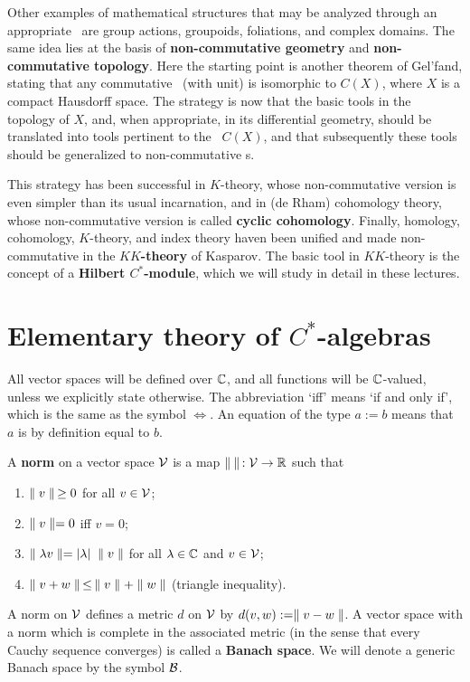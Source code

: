 Other examples of mathematical structures that may be analyzed through
an appropriate \ca\ are group actions, groupoids, foliations, and
complex domains.  The same idea lies at the basis of {\bf
non-commutative geometry} and {\bf non-commutative topology}. Here the
starting point is another theorem of Gel'fand, stating that any
commutative \ca\ (with unit) is isomorphic to $C(X)$, where $X$ is a
compact Hausdorff space. The strategy is now that the basic tools in
the topology of $X$, and, when appropriate, in its differential
geometry, should be translated into tools pertinent to the \ca\
$C(X)$, and that subsequently these tools should be generalized to
non-commutative \ca s.

This strategy has been successful in $K$-theory, whose non-commutative
version is even simpler than its usual incarnation, and in (de Rham)
cohomology theory, whose non-commutative version is called {\bf cyclic
cohomology}. Finally, homology, cohomology, $K$-theory, and index
theory haven been unified and made non-commutative in the {\bf
$KK$-theory} of Kasparov.  The basic tool in $KK$-theory is the
concept of a {\bf Hilbert $C^*$-module}, which we will study in detail
in these lectures.
\section{Elementary theory of $C^*$-algebras}
 All vector spaces will be defined over ${\Bbb C}$,
and all functions will be ${\Bbb C}$-valued, unless we explicitly state
otherwise.  The abbreviation `iff' means `if and only if', which is
the same as the symbol $\Leftrightarrow$. An equation of the type
$a:=b$ means that $a$ is by definition equal to $b$.
\begin{Definition} A {\bf norm} on a vector space ${\cal V}$ is a map
$\parallel\:\parallel\,:{\cal V}\rightarrow{\Bbb R}$ such that
\begin{enumerate}
\item
$\parallel v\parallel\,\geq 0$ for all $v\in{\cal V}$;
\item
$\parallel v\parallel=0$ iff $v=0$;
\item
$\parallel\lambda v\parallel=|\lambda|\; \parallel v\parallel$ for all $\lambda\in{\Bbb C}$ and $v\in{\cal V}$;
\item
$\parallel v+w\parallel\,\leq \,\parallel v\parallel+\parallel w\parallel$ (triangle inequality).
\end{enumerate}
A norm on ${\cal V}$ defines a metric $d$ on ${\cal V}$ by $d(v,w):=\parallel v-w\parallel$.
A vector space with a norm which is complete in the associated metric
(in the sense that every Cauchy sequence converges) is called a {\bf
Banach space}. We will denote a generic Banach space by the symbol
${\cal B}$.\end{Definition}
 

